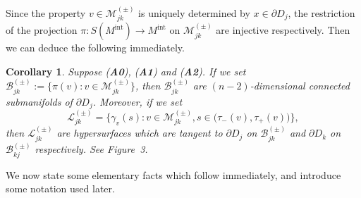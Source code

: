 \documentclass[a4paper,11pt,reqno]{amsart}
\numberwithin{equation}{section}
\newtheorem{corollary}[theorem]{Corollary}
\theoremstyle{definition}
\theoremstyle{remark}
\begin{document}
%
%
Since the property $v \in \mathcal{M}_{jk}^{(\pm)}$ 
is uniquely determined by $x \in \partial{D_j}$, 
the restriction of the projection 
$\pi: S(M^\text{int}) \rightarrow M^\text{int}$ 
on $\mathcal{M}_{jk}^{(\pm)}$ are injective respectively. 
Then we can deduce the following immediately. 
%
%
\begin{corollary}
\label{theorem:ljk} 
Suppose {\rm ({\bf A0})}, {\rm ({\bf A1})} and {\rm ({\bf A2})}. 
If we set 
$\mathcal{B}_{jk}^{(\pm)}:=\{\pi(v) : v \in \mathcal{M}_{jk}^{(\pm)}\}$, 
then $\mathcal{B}_{jk}^{(\pm)}$ are 
$(n-2)$-dimensional connected submanifolds of $\partial{D_j}$. 
Moreover, if we set 
%
%
$$
\mathcal{L}_{jk}^{(\pm)}
=
\bigl\{
\gamma_v(s) : 
v \in \mathcal{M}_{jk}^{(\pm)}, 
s \in \bigl(\tau_-(v),\tau_+(v)\bigr)
\bigr\},
$$
%
%
then $\mathcal{L}_{jk}^{(\pm)}$ are hypersurfaces which are tangent to 
$\partial{D_j}$ on $\mathcal{B}_{jk}^{(\pm)}$ 
and $\partial{D_k}$ on $\mathcal{B}_{kj}^{(\pm)}$ respectively. 
See Figure~3. 
%
%
\end{corollary} 
%
%
We now state some elementary facts which follow immediately, 
and introduce some notation used later. 
%
%
\end{document}
